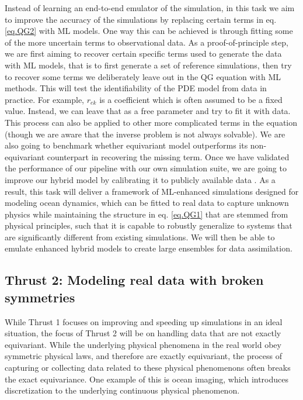\documentclass[11pt]{article}
\begin{document}
Instead of learning an end-to-end emulator of the simulation, in this task we aim to improve the accuracy of the simulations by replacing certain terms in eq. \ref{eq.QG2} with ML models. One way this can be achieved is through fitting some of the more uncertain terms to observational data.
As a proof-of-principle step, we are first aiming to recover certain specific terms used to generate the data with ML models, that is to first generate a set of reference simulations, then try to recover some terms we deliberately leave out in the QG equation with ML methods. This will test the identifiability of the PDE model from data in practice. For example, $r_{ek}$ is a coefficient which is often assumed to be a fixed value. Instead, we can leave that as a free parameter and try to fit it with data. This process can also be applied to other more complicated terms in the equation (though we are aware that the inverse problem is not always solvable). We are also going to benchmark whether equivariant model outperforms its non-equivariant counterpart in recovering the missing term. Once we have validated the performance of our pipeline with our own simulation suite, we are going to improve our hybrid model by calibrating it to publicly available data \cite{2004AGUFMSF31A0712O}. 
As a result, this task will deliver a framework of ML-enhanced simulations designed for modeling ocean dynamics, which can be fitted to real data to capture unknown physics while maintaining the structure in eq. \ref{eq.QG1} that are stemmed from physical principles, such that it is capable to robustly generalize to systems that are significantly different from existing simulations. We will then be able to emulate enhanced hybrid models to create large ensembles for data assimilation.

\subsection{Thrust 2: Modeling real data with broken symmetries}

While Thrust 1 focuses on improving and speeding up simulations in an ideal situation, the focus of Thrust 2 will be on handling data that are not exactly equivariant. While the underlying physical phenomena in the real world obey symmetric physical laws, and therefore are exactly equivariant, the process of capturing or collecting data related to these physical phenomenons often breaks the exact equivariance. One example of this is ocean imaging, which introduces discretization to the underlying continuous physical phenomenon. 
\end{document}
